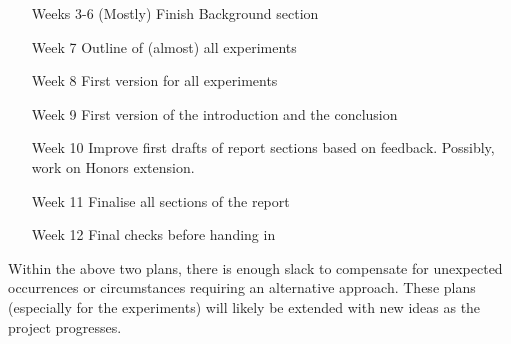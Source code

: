 \documentclass[11pt]{article} %
\begin{document}
\begin{enumerate}
	\item[Weeks 3-6] (Mostly) Finish Background section
	\item[Week 7] Outline of (almost) all experiments
	\item[Week 8] First version for all experiments
	\item[Week 9] First version of the introduction and the conclusion
	\item[Week 10] Improve first drafts of report sections based on feedback. Possibly, work on Honors extension.
	\item[Week 11] Finalise all sections of the report
	\item[Week 12] Final checks before handing in
\end{enumerate}

Within the above two plans, there is enough slack to compensate for unexpected occurrences or circumstances requiring an alternative approach. These plans (especially for the experiments) will likely be extended with new ideas as the project progresses.

\newpage


\end{document}

